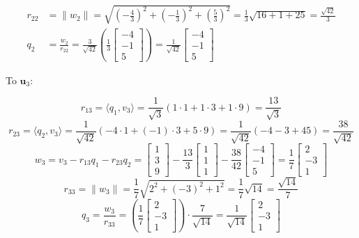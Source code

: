 \documentclass{article}
\newcommand{\0}{{\mathbf{0}}} %
\begin{document}
$$
\begin{aligned}
r_{22} &= \|w_2\| = \sqrt{\left(-\frac{4}{3}\right)^2 + \left(-\frac{1}{3}\right)^2 + \left(\frac{5}{3}\right)^2} = \frac{1}{3}\sqrt{16+1+25} = \frac{\sqrt{42}}{3} \\
q_2 &= \frac{w_2}{r_{22}} = \frac{3}{\sqrt{42}} \left( \frac{1}{3}
\begin{bmatrix} -4 \\ -1 \\ 5
\end{bmatrix} \right) = \frac{1}{\sqrt{42}}
\begin{bmatrix} -4 \\ -1 \\ 5
\end{bmatrix}
\end{aligned}$$

To $\mathbf{u}_3$:

$$r_{13} = \langle q_1, v_3 \rangle = \frac{1}{\sqrt{3}} (1\cdot 1 + 1\cdot 3 + 1\cdot 9) = \frac{13}{\sqrt{3}}$$
$$r_{23} = \langle q_2, v_3 \rangle = \frac{1}{\sqrt{42}} (-4\cdot 1 + (-1)\cdot 3 + 5\cdot 9) = \frac{1}{\sqrt{42}} (-4 - 3 + 45) = \frac{38}{\sqrt{42}}$$
$$w_3 = v_3 - r_{13}q_1 - r_{23}q_2 =
\begin{bmatrix} 1 \\ 3 \\ 9
\end{bmatrix} - \frac{13}{3}
\begin{bmatrix} 1 \\ 1 \\ 1
\end{bmatrix} - \frac{38}{42}
\begin{bmatrix} -4 \\ -1 \\ 5
\end{bmatrix} = \frac{1}{7}
\begin{bmatrix} 2 \\ -3 \\ 1
\end{bmatrix}$$
$$r_{33} = \|w_3\| = \frac{1}{7} \sqrt{2^2 + (-3)^2 + 1^2} = \frac{1}{7} \sqrt{14} = \frac{\sqrt{14}}{7}$$
$$q_3 = \frac{w_3}{r_{33}} = \left( \frac{1}{7}
\begin{bmatrix} 2 \\ -3 \\ 1
\end{bmatrix} \right) \cdot \frac{7}{\sqrt{14}} = \frac{1}{\sqrt{14}}
\begin{bmatrix} 2 \\ -3 \\ 1
\end{bmatrix}$$
\end{document}
